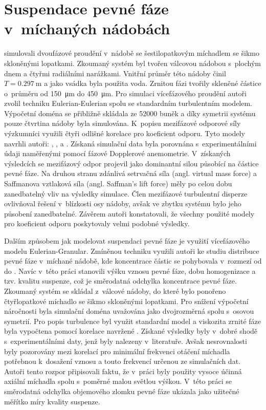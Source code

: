 \section{Suspendace pevné fáze v~míchaných nádobách}
\citet{lju01} simulovali dvoufázové proudění v~nádobě se šes\-ti\-lo\-pat\-ko\-vým míchadlem se šikmo skloněnými lopatkami. Zkoumaný systém byl tvořen válcovou nádobou s~plochým dnem a čtyřmi radiálními narážkami. Vnitřní průměr této nádoby činil $T=\SI{0.297}{\meter}$ a jako vsádka byla použita voda. Zrnitou fázi tvořily skleněné částice o~průměru od \SI{150}{\micro\meter} do \SI{450}{\micro\meter}. Pro simulaci vícefázového proudění autoři zvolil techniku Eulerian-Eulerian spolu se standardním \keps{} turbulentním modelem. Výpočetní doména se přibližně skládala ze \num{52000} buněk a díky symetrii systému pouze čtvrtina nádoby byla simulována. K~popisu mezifázové odporové síly výzkumníci využili čtyři odlišné korelace pro koeficient odporu. Tyto modely navrhli autoři: \citet{schi32}, \citet{ish79}, \citet{ihme72} a \citet{bru98}. Získaná simulační data byla porovnána s~experimentálními údaji naměřenými pomocí fázové Dopplerové anemometrie. V~získaných výsledcích se mezifázový odpor projevil jako dominantní silou působící na částice pevné fáze. Na druhou stranu zdánlivá setrvačná síla (angl. virtual mass force) a Saffmanova vztlaková síla (angl. Saffman's lift force) měly po celou dobu zanedbatelný vliv na výsledky simulace. Člen mezifázové turbulentní disperze ovlivňoval řešení v~blízkosti osy nádoby, avšak ve zbytku systému bylo jeho působení zanedbatelné. Závěrem autoři konstatovali, že všechny použité modely pro koeficient odporu poskytovaly velmi podobné výsledky.

Dalším způsobem jak modelovat suspendaci pevné fáze je využití vícefázového modelu Eulerian-Granular. Zmíněnou techniku využili autoři \citet{oshi02} ke studiu distribuce pevné fáze v~míchané nádobě, kde koncentrace částic se pohybovala v~rozmezí od  do . Navíc v~této práci stanovili výšku vznosu pevné fáze, dobu homogenizace a tzv. kvalitu suspenze, což je směrodatná odchylka koncentrace pevné fáze. Zkoumaný systém se skládal z~válcové nádoby, do které bylo ponořeno čtyřlopatkové míchadlo se šikmo skloněnými lopatkami. Pro snížení výpočetní náročnosti byla simulační doména uvažována jako dvojrozměrná spolu s~osovou symetrií. Pro popis turbulence byl využit standardní \keps{} model a viskozita zrnité fáze byla vypočtena pomocí korelace navržené \citet{syam93}. Získané výsledky byly v~dobré shodě s~experimentálními daty, jenž byly nalezeny v~literatuře. Avšak nesrovnalosti byly pozorovány mezi korelací pro minimální frekvenci otáčení míchadla potřebnou k~dosažení vznosu a touto frekvencí určenou ze simulačních dat. Autoři tento rozpor připisovali faktu, že v~práci byly použity vysoce účinná axiální míchadla spolu s~poměrné malou světlou výškou. V~této práci se směrodatná odchylka objemového zlomku pevné fáze ukázala jako užitečné měřítko míry kvality suspenze.        

